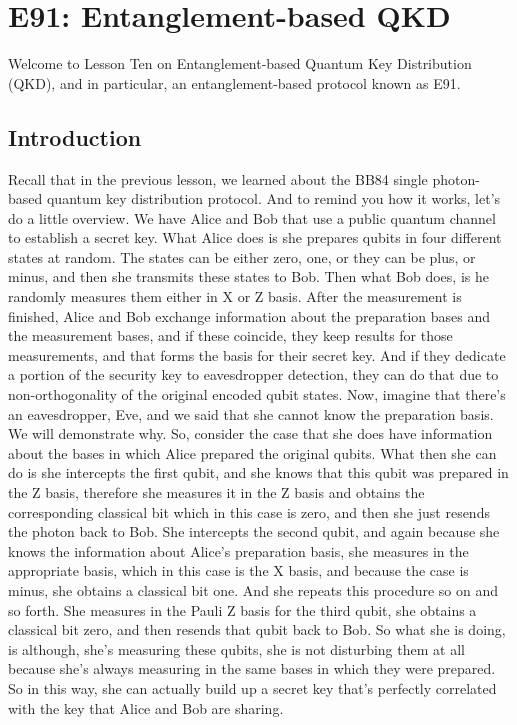 \chapter{E91: Entanglement-based QKD}

Welcome to Lesson Ten on Entanglement-based Quantum Key Distribution (QKD), and in particular, an entanglement-based protocol known as E91.

\section{Introduction}


Recall that in the previous lesson, we learned about the BB84 single photon-based quantum key distribution protocol. And to remind you how it works, let's do a little overview. We have Alice and Bob that use a public quantum channel to establish a secret key. What Alice does is she prepares qubits in four different states at random. The states can be either zero, one, or they can be plus, or minus, and then she transmits these states to Bob. Then what Bob does, is he randomly measures them either in X or Z basis. After the measurement is finished, Alice and Bob exchange information about the preparation bases and the measurement bases, and if these coincide, they keep results for those measurements, and that forms the basis for their secret key. And if they dedicate a portion of the security key to eavesdropper detection, they can do that due to non-orthogonality of the original encoded qubit states. Now, imagine that there's an eavesdropper, Eve, and we said that she cannot know the preparation basis. We will demonstrate why. So, consider the case that she does have information about the bases in which Alice prepared the original qubits. What then she can do is she intercepts the first qubit, and she knows that this qubit was prepared in the Z basis, therefore she measures it in the Z basis and obtains the corresponding classical bit which in this case is zero, and then she just resends the photon back to Bob. She intercepts the second qubit, and again because she knows the information about Alice's preparation basis, she measures in the appropriate basis, which in this case is the X basis, and because the case is minus, she obtains a classical bit one. And she repeats this procedure so on and so forth. She measures in the Pauli Z basis for the third qubit, she obtains a classical bit zero, and then resends that qubit back to Bob. So what she is doing, is although, she's measuring these qubits, she is not disturbing them at all because she's always measuring in the same bases in which they were prepared. So in this way, she can actually build up a secret key that's perfectly correlated with the key that Alice and Bob are sharing.

